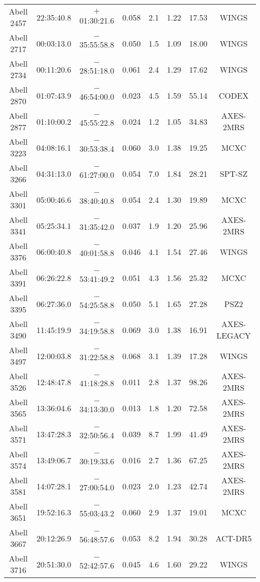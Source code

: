 \begin{table}
\begin{tabular}{cccccccc}
Abell 2457 & 22:35:40.8 & $+$01:30:21.6 & 0.058 & 2.1 & 1.22 & 17.53 & WINGS \\
Abell 2717 & 00:03:13.0 & $-$35:55:58.8 & 0.050 & 1.5 & 1.09 & 18.00 & WINGS \\
Abell 2734 & 00:11:20.6 & $-$28:51:18.0 & 0.061 & 2.4 & 1.29 & 17.62 & WINGS \\
Abell 2870 & 01:07:43.9 & $-$46:54:00.0 & 0.023 & 4.5 & 1.59 & 55.14 & CODEX \\
Abell 2877 & 01:10:00.2 & $-$45:55:22.8 & 0.024 & 1.2 & 1.05 & 34.83 & AXES-2MRS \\
Abell 3223 & 04:08:16.1 & $-$30:53:38.4 & 0.060 & 3.0 & 1.38 & 19.25 & MCXC \\
Abell 3266 & 04:31:13.0 & $-$61:27:00.0 & 0.054 & 7.0 & 1.84 & 28.21 & SPT-SZ \\
Abell 3301 & 05:00:46.6 & $-$38:40:40.8 & 0.054 & 2.4 & 1.30 & 19.89 & MCXC \\
Abell 3341 & 05:25:34.1 & $-$31:35:42.0 & 0.037 & 1.9 & 1.20 & 25.96 & AXES-2MRS \\
Abell 3376 & 06:00:40.8 & $-$40:01:58.8 & 0.046 & 4.1 & 1.54 & 27.46 & WINGS \\
Abell 3391 & 06:26:22.8 & $-$53:41:49.2 & 0.051 & 4.3 & 1.56 & 25.32 & MCXC \\
Abell 3395 & 06:27:36.0 & $-$54:25:58.8 & 0.050 & 5.1 & 1.65 & 27.28 & PSZ2 \\
Abell 3490 & 11:45:19.9 & $-$34:19:58.8 & 0.069 & 3.0 & 1.38 & 16.91 & AXES-LEGACY \\
Abell 3497 & 12:00:03.8 & $-$31:22:58.8 & 0.068 & 3.1 & 1.39 & 17.28 & WINGS \\
Abell 3526 & 12:48:47.8 & $-$41:18:28.8 & 0.011 & 2.8 & 1.37 & 98.26 & AXES-2MRS \\
Abell 3565 & 13:36:04.6 & $-$34:13:30.0 & 0.013 & 1.8 & 1.20 & 72.58 & AXES-2MRS \\
Abell 3571 & 13:47:28.3 & $-$32:50:56.4 & 0.039 & 8.7 & 1.99 & 41.49 & AXES-2MRS \\
Abell 3574 & 13:49:06.7 & $-$30:19:33.6 & 0.016 & 2.7 & 1.36 & 67.25 & AXES-2MRS \\
Abell 3581 & 14:07:28.1 & $-$27:00:54.0 & 0.023 & 2.0 & 1.23 & 42.74 & AXES-2MRS \\
Abell 3651 & 19:52:16.3 & $-$55:03:43.2 & 0.060 & 2.9 & 1.37 & 19.01 & MCXC \\
Abell 3667 & 20:12:26.9 & $-$56:48:57.6 & 0.053 & 8.2 & 1.94 & 30.28 & ACT-DR5 \\
Abell 3716 & 20:51:30.0 & $-$52:42:57.6 & 0.045 & 4.6 & 1.60 & 29.22 & WINGS \\

\end{tabular}
\end{table}
